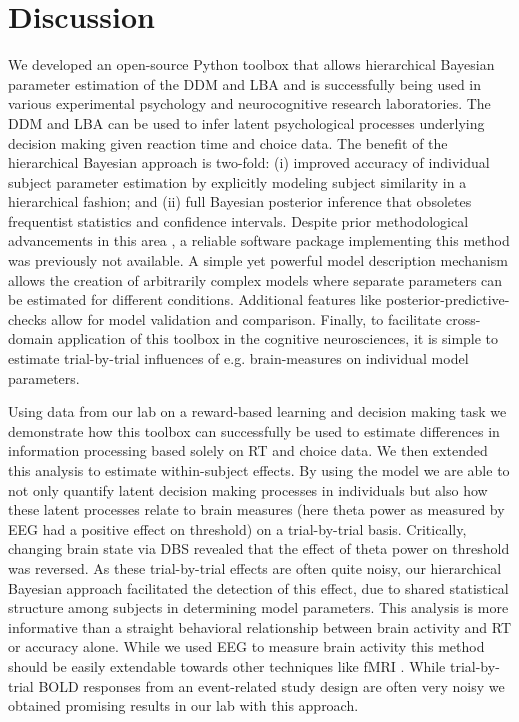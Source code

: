 \documentclass[letterpaper,10pt,english]{article}
\begin{document}
\section*{Discussion}
We developed an open-source Python toolbox that allows hierarchical Bayesian parameter estimation of the DDM and LBA and is successfully being used in various experimental psychology and neurocognitive research laboratories. The DDM and LBA can be used to infer latent psychological processes underlying decision making given reaction time and choice data. The benefit of the hierarchical Bayesian approach is two-fold: (i) improved accuracy of individual subject parameter estimation by explicitly modeling subject similarity in a hierarchical fashion; and (ii) full Bayesian posterior inference that obsoletes frequentist statistics and confidence intervals. Despite prior methodological advancements in this area \citep{VandekerckhoveTuerlinckxLee11}, a reliable software package implementing this method was previously not available. A simple yet powerful model description mechanism allows the creation of arbitrarily complex models where separate parameters can be estimated for different conditions. Additional features like posterior-predictive-checks allow for model validation and comparison. Finally, to facilitate cross-domain application of this toolbox in the cognitive neurosciences, it is simple to estimate trial-by-trial influences of e.g. brain-measures on individual model parameters.

Using data from our lab on a reward-based learning and decision making task \citep{CavanaghWieckiCohenEtAl11} we demonstrate how this toolbox can successfully be used to estimate differences in information processing based solely on RT and choice data. We then extended this analysis to estimate within-subject effects. By using the  model we are able to not only quantify latent decision making processes in individuals but also how these latent processes relate to brain measures (here theta power as measured by EEG had a positive effect on threshold) on a trial-by-trial basis. Critically, changing brain state via DBS revealed that the effect of theta power on threshold was reversed. As these trial-by-trial effects are often quite noisy, our hierarchical Bayesian approach facilitated the detection of this effect, due to shared statistical structure among subjects in determining model parameters. This analysis is more informative than a straight behavioral relationship between brain activity and RT or accuracy alone. While we used EEG to measure brain activity this method should be easily extendable towards other techniques like fMRI \citep[e.g.][]{ManenBrownEicheleEtAl11}. While trial-by-trial BOLD responses from an event-related study design are often very noisy we obtained promising results in our lab with this approach.
\end{document}
